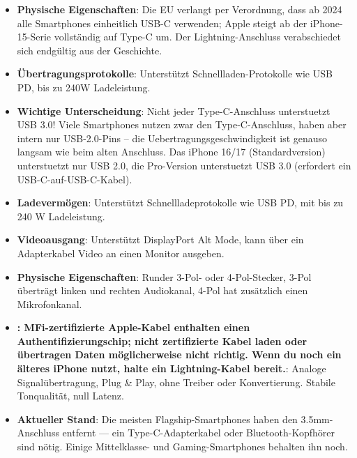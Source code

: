 
\begin{itemize}
  \item \textbf{Physische Eigenschaften}: Die EU verlangt per Verordnung, dass ab 2024 alle Smartphones einheitlich USB-C verwenden; Apple steigt ab der iPhone-15-Serie vollständig auf Type-C um. Der Lightning-Anschluss verabschiedet sich endgültig aus der Geschichte.
  \item \textbf{Übertragungsprotokolle}: Unterstützt Schnellladen-Protokolle wie USB PD, bis zu 240W Ladeleistung.
  \item \textbf{Wichtige Unterscheidung}: Nicht jeder Type-C-Anschluss unterstuetzt USB 3.0! Viele Smartphones nutzen zwar den Type-C-Anschluss, haben aber intern nur USB-2.0-Pins – die Uebertragungsgeschwindigkeit ist genauso langsam wie beim alten Anschluss. Das iPhone 16/17 (Standardversion) unterstuetzt nur USB 2.0, die Pro-Version unterstuetzt USB 3.0 (erfordert ein USB-C-auf-USB-C-Kabel).
  \item \textbf{Ladevermögen}: Unterstützt Schnellladeprotokolle wie USB PD, mit bis zu 240 W Ladeleistung.
  \item \textbf{Videoausgang}: Unterstützt DisplayPort Alt Mode, kann über ein Adapterkabel Video an einen Monitor ausgeben.
\end{itemize}


\begin{itemize}
  \item \textbf{Physische Eigenschaften}: Runder 3-Pol- oder 4-Pol-Stecker, 3-Pol überträgt linken und rechten Audiokanal, 4-Pol hat zusätzlich einen Mikrofonkanal.
  \item \textbf{: MFi-zertifizierte Apple-Kabel enthalten einen Authentifizierungschip; nicht zertifizierte Kabel laden oder übertragen Daten möglicherweise nicht richtig. Wenn du noch ein älteres iPhone nutzt, halte ein Lightning-Kabel bereit.}: Analoge Signalübertragung, Plug \& Play, ohne Treiber oder Konvertierung. Stabile Tonqualität, null Latenz.
  \item \textbf{Aktueller Stand}: Die meisten Flagship-Smartphones haben den 3.5mm-Anschluss entfernt — ein Type-C-Adapterkabel oder Bluetooth-Kopfhörer sind nötig. Einige Mittelklasse- und Gaming-Smartphones behalten ihn noch.
\end{itemize}


